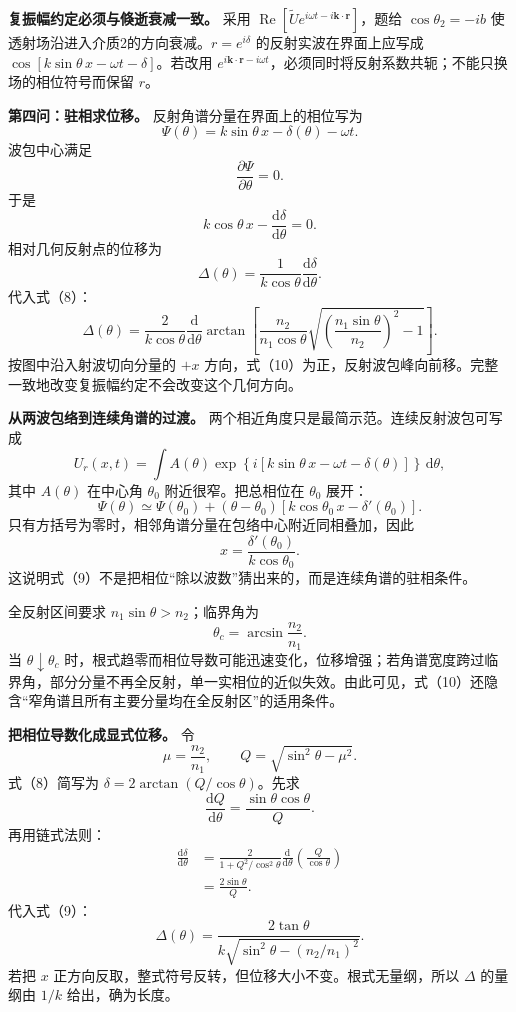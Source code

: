 \documentclass[12pt,a4paper,UTF8]{ctexart}
\begin{document}
\textbf{复振幅约定必须与倏逝衰减一致。} 采用
\(\operatorname{Re}[\widetilde U e^{i\omega t-i\bm k\cdot\bm r}]\)，题给
\(\cos\theta_2=-ib\) 使透射场沿进入介质2的方向衰减。\(r=e^{i\delta}\)
的反射实波在界面上应写成
\(\cos[k\sin\theta\,x-\omega t-\delta]\)。若改用
\(e^{i\bm k\cdot\bm r-i\omega t}\)，必须同时将反射系数共轭；不能只换场的相位符号而保留
\(r\)。

\textbf{第四问：驻相求位移。} 反射角谱分量在界面上的相位写为 \[
\Psi(\theta)=k\sin\theta\,x-\delta(\theta)-\omega t.
\] 波包中心满足 \[
\frac{\partial\Psi}{\partial\theta}=0.
\] 于是 \[
k\cos\theta\,x-\frac{\mathrm d\delta}{\mathrm d\theta}=0.
\] 相对几何反射点的位移为 \[
\boxed{
\Delta(\theta)
=\frac1{k\cos\theta}
\frac{\mathrm d\delta}{\mathrm d\theta}
}. \tag{9}
\] 代入式（8）： \[
\boxed{
\Delta(\theta)
=\frac{2}{k\cos\theta}
\frac{\mathrm d}{\mathrm d\theta}
\arctan\left[
\frac{n_2}{n_1\cos\theta}
\sqrt{
\left(\frac{n_1\sin\theta}{n_2}\right)^2-1
}
\right]
}. \tag{10}
\] 按图中沿入射波切向分量的 \(+x\)
方向，式（10）为正，反射波包峰向前移。完整一致地改变复振幅约定不会改变这个几何方向。

\textbf{从两波包络到连续角谱的过渡。}
两个相近角度只是最简示范。连续反射波包可写成 \[
U_r(x,t)=\int A(\theta)
\exp\!\left\{i\left[k\sin\theta\,x-\omega t-\delta(\theta)\right]\right\}
\,\mathrm d\theta,
\] 其中 \(A(\theta)\) 在中心角 \(\theta_0\) 附近很窄。把总相位在
\(\theta_0\) 展开： \[
\Psi(\theta)\simeq\Psi(\theta_0)
+(\theta-\theta_0)
\left[k\cos\theta_0\,x-\delta'(\theta_0)\right].
\] 只有方括号为零时，相邻角谱分量在包络中心附近同相叠加，因此 \[
x=\frac{\delta'(\theta_0)}{k\cos\theta_0}.
\] 这说明式（9）不是把相位``除以波数''猜出来的，而是连续角谱的驻相条件。

全反射区间要求 \(n_1\sin\theta>n_2\)；临界角为 \[
\theta_c=\arcsin\frac{n_2}{n_1}.
\] 当 \(\theta\downarrow\theta_c\)
时，根式趋零而相位导数可能迅速变化，位移增强；若角谱宽度跨过临界角，部分分量不再全反射，单一实相位的近似失效。由此可见，式（10）还隐含``窄角谱且所有主要分量均在全反射区''的适用条件。

\textbf{把相位导数化成显式位移。} 令 \[
\mu=\frac{n_2}{n_1},\qquad
Q=\sqrt{\sin^2\theta-\mu^2}.
\] 式（8）简写为 \(\delta=2\arctan(Q/\cos\theta)\)。先求 \[
\frac{\mathrm dQ}{\mathrm d\theta}
=\frac{\sin\theta\cos\theta}{Q}.
\] 再用链式法则： \[
\begin{aligned}
\frac{\mathrm d\delta}{\mathrm d\theta}
&=\frac{2}{1+Q^2/\cos^2\theta}
\frac{\mathrm d}{\mathrm d\theta}
\left(\frac Q{\cos\theta}\right)\\
&=\frac{2\sin\theta}{Q}.
\end{aligned}
\] 代入式（9）： \[
\boxed{
\Delta(\theta)
=\frac{2\tan\theta}
{k\sqrt{\sin^2\theta-(n_2/n_1)^2}}
}.
\] 若把 \(x\) 正方向反取，整式符号反转，但位移大小不变。根式无量纲，所以
\(\Delta\) 的量纲由 \(1/k\) 给出，确为长度。
\end{document}
